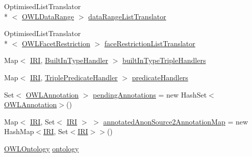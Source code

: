 \begin{DoxyCompactItemize}
\item 
Optimised\-List\-Translator\\*
$<$ \hyperlink{interfaceorg_1_1semanticweb_1_1owlapi_1_1model_1_1_o_w_l_data_range}{O\-W\-L\-Data\-Range} $>$ \hyperlink{classorg_1_1coode_1_1owlapi_1_1rdfxml_1_1parser_1_1_o_w_l_r_d_f_consumer_aba443fe97df78cac4bb6383753591cd9}{data\-Range\-List\-Translator}
\item 
Optimised\-List\-Translator\\*
$<$ \hyperlink{interfaceorg_1_1semanticweb_1_1owlapi_1_1model_1_1_o_w_l_facet_restriction}{O\-W\-L\-Facet\-Restriction} $>$ \hyperlink{classorg_1_1coode_1_1owlapi_1_1rdfxml_1_1parser_1_1_o_w_l_r_d_f_consumer_a34d339d5792ff90fe59816a8098bc408}{face\-Restriction\-List\-Translator}
\item 
Map$<$ \hyperlink{classorg_1_1semanticweb_1_1owlapi_1_1model_1_1_i_r_i}{I\-R\-I}, \hyperlink{classorg_1_1coode_1_1owlapi_1_1rdfxml_1_1parser_1_1_built_in_type_handler}{Built\-In\-Type\-Handler} $>$ \hyperlink{classorg_1_1coode_1_1owlapi_1_1rdfxml_1_1parser_1_1_o_w_l_r_d_f_consumer_ae30c34f9160f73a08927efc70927d22a}{built\-In\-Type\-Triple\-Handlers}
\item 
Map$<$ \hyperlink{classorg_1_1semanticweb_1_1owlapi_1_1model_1_1_i_r_i}{I\-R\-I}, \hyperlink{classorg_1_1coode_1_1owlapi_1_1rdfxml_1_1parser_1_1_triple_predicate_handler}{Triple\-Predicate\-Handler} $>$ \hyperlink{classorg_1_1coode_1_1owlapi_1_1rdfxml_1_1parser_1_1_o_w_l_r_d_f_consumer_af10918f93690b2e84bacf53ef603df29}{predicate\-Handlers}
\item 
Set$<$ \hyperlink{interfaceorg_1_1semanticweb_1_1owlapi_1_1model_1_1_o_w_l_annotation}{O\-W\-L\-Annotation} $>$ \hyperlink{classorg_1_1coode_1_1owlapi_1_1rdfxml_1_1parser_1_1_o_w_l_r_d_f_consumer_aa1fcab65a5a2d1da048d361d58212425}{pending\-Annotations} = new Hash\-Set$<$\hyperlink{interfaceorg_1_1semanticweb_1_1owlapi_1_1model_1_1_o_w_l_annotation}{O\-W\-L\-Annotation}$>$()
\item 
Map$<$ \hyperlink{classorg_1_1semanticweb_1_1owlapi_1_1model_1_1_i_r_i}{I\-R\-I}, Set$<$ \hyperlink{classorg_1_1semanticweb_1_1owlapi_1_1model_1_1_i_r_i}{I\-R\-I} $>$ $>$ \hyperlink{classorg_1_1coode_1_1owlapi_1_1rdfxml_1_1parser_1_1_o_w_l_r_d_f_consumer_a8aef593f949d6e76e3b1d774822e3d00}{annotated\-Anon\-Source2\-Annotation\-Map} = new Hash\-Map$<$\hyperlink{classorg_1_1semanticweb_1_1owlapi_1_1model_1_1_i_r_i}{I\-R\-I}, Set$<$\hyperlink{classorg_1_1semanticweb_1_1owlapi_1_1model_1_1_i_r_i}{I\-R\-I}$>$$>$()
\item 
\hyperlink{interfaceorg_1_1semanticweb_1_1owlapi_1_1model_1_1_o_w_l_ontology}{O\-W\-L\-Ontology} \hyperlink{classorg_1_1coode_1_1owlapi_1_1rdfxml_1_1parser_1_1_o_w_l_r_d_f_consumer_ab3a35814d445d22841f20642eafedfa7}{ontology}
$$
\end{DoxyCompactItemize}
